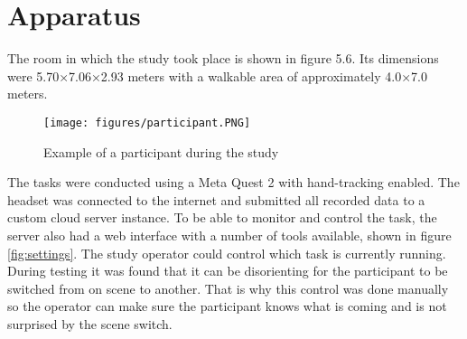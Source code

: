 




\section{Apparatus}

The room in which the study took place is shown in figure 5.6. Its dimensions were 5.70×7.06×2.93 meters with a walkable area of approximately 4.0×7.0 meters.

\begin{figure}[!ht]
    \centering
    \texttt{[image: figures/participant.PNG]}
    \caption{Example of a participant during the study}
    \label{fig:video}
\end{figure}

The tasks were conducted using a Meta Quest 2 with hand-tracking enabled. The headset was connected to the internet and submitted all recorded data to a custom cloud server instance. To be able to monitor and control the task, the server also had a web interface with a number of tools available, shown in figure \ref{fig:settings}. The study operator could control which task is currently running. During testing it was found that it can be disorienting for the participant to be switched from on scene to another. That is why this control was done manually so the operator can make sure the participant knows what is coming and is not surprised by the scene switch.

